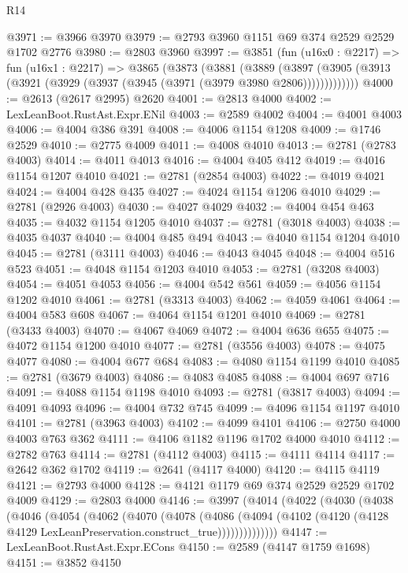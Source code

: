 \begin{lexlean}{R14}
\begin{coremodule}
@3971 := @3966 @3970
@3979 := @2793 @3960 @1151 @69 @374 @2529 @2529 @1702 @2776
@3980 := @2803 @3960
@3997 := @3851
    (fun (u16x0 : @2217) =>
    fun (u16x1 : @2217) =>
    @3865
      (@3873
        (@3881
          (@3889
            (@3897 (@3905 (@3913 (@3921 (@3929 (@3937 (@3945 (@3971 (@3979 @3980 @2806)))))))))))))
@4000 := @2613 (@2617 @2995) @2620
@4001 := @2813 @4000
@4002 := LexLeanBoot.RustAst.Expr.ENil
@4003 := @2589 @4002
@4004 := @4001 @4003
@4006 := @4004 @386 @391
@4008 := @4006 @1154 @1208
@4009 := @1746 @2529
@4010 := @2775 @4009
@4011 := @4008 @4010
@4013 := @2781 (@2783 @4003)
@4014 := @4011 @4013
@4016 := @4004 @405 @412
@4019 := @4016 @1154 @1207 @4010
@4021 := @2781 (@2854 @4003)
@4022 := @4019 @4021
@4024 := @4004 @428 @435
@4027 := @4024 @1154 @1206 @4010
@4029 := @2781 (@2926 @4003)
@4030 := @4027 @4029
@4032 := @4004 @454 @463
@4035 := @4032 @1154 @1205 @4010
@4037 := @2781 (@3018 @4003)
@4038 := @4035 @4037
@4040 := @4004 @485 @494
@4043 := @4040 @1154 @1204 @4010
@4045 := @2781 (@3111 @4003)
@4046 := @4043 @4045
@4048 := @4004 @516 @523
@4051 := @4048 @1154 @1203 @4010
@4053 := @2781 (@3208 @4003)
@4054 := @4051 @4053
@4056 := @4004 @542 @561
@4059 := @4056 @1154 @1202 @4010
@4061 := @2781 (@3313 @4003)
@4062 := @4059 @4061
@4064 := @4004 @583 @608
@4067 := @4064 @1154 @1201 @4010
@4069 := @2781 (@3433 @4003)
@4070 := @4067 @4069
@4072 := @4004 @636 @655
@4075 := @4072 @1154 @1200 @4010
@4077 := @2781 (@3556 @4003)
@4078 := @4075 @4077
@4080 := @4004 @677 @684
@4083 := @4080 @1154 @1199 @4010
@4085 := @2781 (@3679 @4003)
@4086 := @4083 @4085
@4088 := @4004 @697 @716
@4091 := @4088 @1154 @1198 @4010
@4093 := @2781 (@3817 @4003)
@4094 := @4091 @4093
@4096 := @4004 @732 @745
@4099 := @4096 @1154 @1197 @4010
@4101 := @2781 (@3963 @4003)
@4102 := @4099 @4101
@4106 := @2750 @4000 @4003 @763 @362
@4111 := @4106 @1182 @1196 @1702 @4000 @4010
@4112 := @2782 @763
@4114 := @2781 (@4112 @4003)
@4115 := @4111 @4114
@4117 := @2642 @362 @1702
@4119 := @2641 (@4117 @4000)
@4120 := @4115 @4119
@4121 := @2793 @4000
@4128 := @4121 @1179 @69 @374 @2529 @2529 @1702 @4009
@4129 := @2803 @4000
@4146 := @3997
    (@4014
      (@4022
        (@4030
          (@4038
            (@4046
              (@4054
                (@4062
                  (@4070
                    (@4078
                      (@4086
                        (@4094
                          (@4102
                            (@4120 (@4128 @4129 LexLeanPreservation.construct_true))))))))))))))
@4147 := LexLeanBoot.RustAst.Expr.ECons
@4150 := @2589 (@4147 @1759 @1698)
@4151 := @3852 @4150

\end{coremodule}
\end{lexlean}
